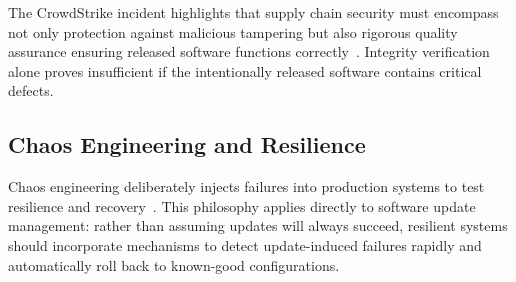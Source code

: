 \documentclass[sigconf,nonacm]{acmart}
\begin{document}
The CrowdStrike incident highlights that supply chain security must encompass not only
protection against malicious tampering but also rigorous quality assurance ensuring
released software functions correctly~\cite{ladisa2023sok,ohm2020backstabbers}. Integrity
verification alone proves insufficient if the intentionally released software contains
critical defects.

\subsection{Chaos Engineering and Resilience}

Chaos engineering deliberately injects failures into production systems to test resilience
and recovery~\cite{basiri2021teaching}. This philosophy applies directly to software update
management: rather than assuming updates will always succeed, resilient systems should
incorporate mechanisms to detect update-induced failures rapidly and automatically roll
back to known-good configurations.
\end{document}
